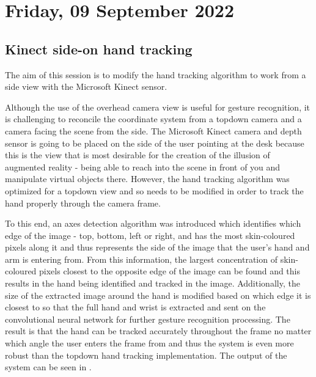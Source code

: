 \section[2022/09/09]{Friday, 09 September 2022}

\subsection{Kinect side-on hand tracking}

The aim of this session is to modify the hand tracking algorithm to work from a side view with the Microsoft Kinect sensor. 

Although the use of the overhead camera view is useful for gesture recognition, it is challenging to reconcile the coordinate system from a topdown camera and a camera facing the scene from the side. The Microsoft Kinect camera and depth sensor is going to be placed on the side of the user pointing at the desk because this is the view that is most desirable for the creation of the illusion of augmented reality - being able to reach into the scene in front of you and manipulate virtual objects there. However, the hand tracking algorithm was optimized for a topdown view and so needs to be modified in order to track the hand properly through the camera frame.

To this end, an axes detection algorithm was introduced which identifies which edge of the image - top, bottom, left or right, and has the most skin-coloured pixels along it and thus represents the side of the image that the user's hand and arm is entering from. From this information, the largest concentration of skin-coloured pixels closest to the opposite edge of the image can be found and this results in the hand being identified and tracked in the image. Additionally, the size of the extracted image around the hand is modified based on which edge it is closest to so that the full hand and wrist is extracted and sent on the convolutional neural network for further gesture recognition processing. The result is that the hand can be tracked accurately throughout the frame no matter which angle the user enters the frame from and thus the system is even more robust than the topdown hand tracking implementation. The output of the system can be seen in .

